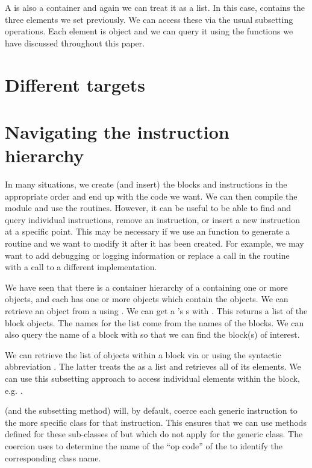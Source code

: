 \documentclass[article]{jss}
\begin{document}
A  is also a container and again we can treat it as a
list. In this case,  contains the three elements we
set previously.  We can access these via the usual subsetting
operations. Each element is  object and we can query
it using the functions we have discussed throughout this paper.



\section{Different targets}

\section{Navigating the instruction hierarchy}
In many situations, we create (and insert) the blocks and instructions
in the appropriate order and end up with the code we want.  We can
then compile the module and use the routines.  However, it can be
useful to be able to find and query individual instructions, remove an
instruction, or insert a new instruction at a specific point.  This
may be necessary if we use an \R{} function to generate a routine and
we want to modify it after it has been created.  For example, we may
want to add debugging or logging information or replace a call in the
routine with a call to a different implementation.

We have seen that there is a container hierarchy of a 
containing one or more  objects, and each
 has one or more  objects which
contain the  objects.
We can retrieve an  object from a 
using .
We can get a 's s with
.  This returns a list of the block objects.
The names for the list come from the names of the blocks.
We can also query the name of a block with 
so that we can find the block(s) of interest.

We can retrieve the list of  objects
within a block via  or using
the syntactic abbreviation .
The latter treats the  as a list and retrieves
all of its elements.  We can use this subsetting approach to access
individual  elements within the block, 
e.g. .

 (and the subsetting method)
will, by default, coerce each generic instruction to the more specific
class for that instruction.
This ensures that we can use  methods defined for these
sub-classes of  but which do not apply for
the generic  class.
The coercion uses  to determine the name of the ``op code'' of 
the  to identify the corresponding class name.
\end{document}
